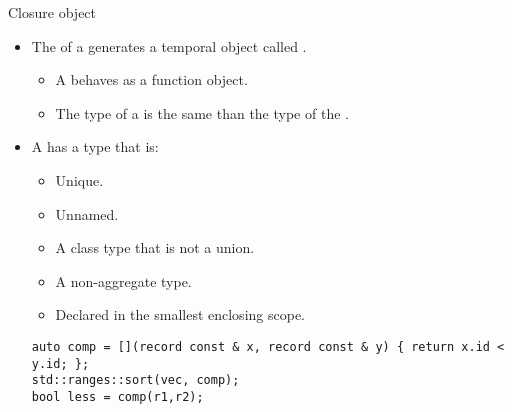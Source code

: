 \begin{frame}[t,fragile]{Closure object}
\begin{itemize}
  \item The  of a  generates
        a temporal object called .
    \begin{itemize}
      \item A  behaves as a function object.
      \item The type of a  is the same than 
            the type of the .
    \end{itemize}

  \item A  has a type that is:
    \begin{itemize}
      \item Unique.
      \item Unnamed.
      \item A class type that is not a union.
      \item A non-aggregate type.
      \item Declared in the smallest enclosing scope.
    \end{itemize}

\begin{lstlisting}
auto comp = [](record const & x, record const & y) { return x.id < y.id; };
std::ranges::sort(vec, comp);
bool less = comp(r1,r2);    
\end{lstlisting}
\end{itemize}
\end{frame}

